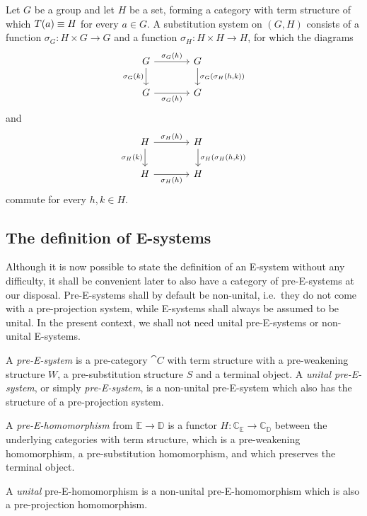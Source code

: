 \begin{eg}
Let $G$ be a group and let $H$ be a set, forming a category with term 
structure of which $T(a)\equiv H$ for every $a\in G$. A substitution
system on $(G,H)$ consists of a function $\sigma_G : H\times G\to G$ and
a function $\sigma_H:H\times H\to H$, for which the diagrams
\begin{equation*}
\begin{tikzcd}[column sep=large]
G \arrow[r,"\sigma_G(h)"]
  \arrow[d,swap,"\sigma_G(k)"]
  &
G \arrow[d,"{\sigma_G(\sigma_H(h,k))}"]
  \\
G \arrow[r,swap,"\sigma_G(h)"] 
& G
\end{tikzcd}
\end{equation*}
and
\begin{equation*}
\begin{tikzcd}[column sep=large]
H \arrow[r,"\sigma_H(h)"]
  \arrow[d,swap,"\sigma_H(k)"]
  &
H \arrow[d,"{\sigma_H(\sigma_H(h,k))}"]
  \\
H \arrow[r,swap,"\sigma_H(h)"]
  &
H
\end{tikzcd}
\end{equation*}
commute for every $h,k\in H$. 
\end{eg}

\subsection{The definition of E-systems}

Although it is now possible to state the definition of an E-system without
any difficulty, it shall be convenient later to also have a category of
pre-E-systems at our disposal. Pre-E-systems shall by default be non-unital,
i.e.~they do not come with a pre-projection system, while E-systems shall
always be assumed to be unital. In the present context, we shall not need
unital pre-E-systems or non-unital E-systems.

\begin{defn}
A \emph{pre-E-system} is a pre-category $\cat{C}$ with term structure
with a pre-weakening structure $W$, a pre-substitution structure $S$ and a terminal
object. A \emph{unital pre-E-system}, or simply \emph{pre-E-system}, is a non-unital pre-E-system
which also has the structure of a pre-projection system. 
\end{defn}

\begin{defn}
A \emph{pre-E-homomorphism} from $\mathbb{E}\to\mathbb{D}$ is a functor
$H:\mathbb{C}_\mathbb{E}\to\mathbb{C}_\mathbb{D}$ between the underlying categories
with term structure, which is a pre-weakening homomorphism, a pre-substitution
homomorphism, and which preserves the terminal object. 

A \emph{unital} pre-E-homomorphism is a non-unital pre-E-homomorphism which is 
also a pre-projection homomorphism. 
\end{defn}

